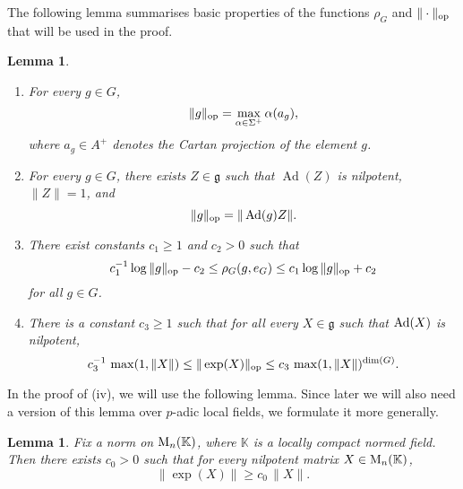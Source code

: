 \documentclass[11pt,reqno,a4paper]{amsart}
\numberwithin{equation}{section}
\newcommand{\gog}{\mathfrak{g}}
\DeclareMathOperator{\Ad}{Ad}
\theoremstyle{theorem}
\newtheorem{lemma}[theorem]{Lemma}
\theoremstyle{definition}
\begin{document}
The following lemma summarises basic properties of the functions $\rho_G$ and $\|\cdot \|_{\rm op}$
that will be used in the proof.

\begin{lemma}
\label{lemma1_outline_main1}
\begin{enumerate}
  \setlength\itemsep{0.5em}

\item[(i)] For every $g\in G$,
$$
\|g\|_{\rm op} =\max_{\alpha \in \Sigma^{+}} \alpha(a_g),  
$$
where $a_g \in A^+$ denotes the Cartan projection of the element $g$.

\item[(ii)] For every $g\in G$, there exists $Z \in \gog$ 
such that $\Ad(Z)$ is nilpotent, $\|Z\| = 1$, and
\[
\|g\|_{\rm op} = \|\Ad(g)Z\|.
\]

\item[(iii)] There exist constants $c_1\ge 1$ and $c_2 > 0$ such that 
\[
c_1^{-1} \log \|g\|_{\rm op} - c_2 \leq \rho_G(g,e_G) \leq c_1 \log \|g\|_{\rm op} + c_2
\] 
for all $g \in G$. 


\item[(iv)] There is a constant $c_3 \geq 1$ such that
for all every $X \in \gog $ such that $\hbox{\rm Ad}(X)$ is nilpotent,
\[
c_3^{-1}\, \max(1,\|X\|) \leq \|\exp(X)\|_{\rm op} \leq c_3\, \max(1,\|X\|)^{\dim(G)}.
\]
\end{enumerate}
\end{lemma}


In the proof of (iv), we will use the following lemma.
Since later we will also need a version of this lemma over $p$-adic local fields,
we formulate it more generally.

\begin{lemma}\label{l:norm}
	Fix a norm on $\hbox{\rm M}_n(\mathbb{K})$, where $\mathbb{K}$ is a locally compact normed field.
	Then there exists $c_0>0$ such that for every nilpotent matrix $X\in \hbox{\rm M}_n(\mathbb{K})$,
	$$
	\|\exp(X)\|\ge c_0\, \|X\|.
	$$
\end{lemma}
\end{document}
